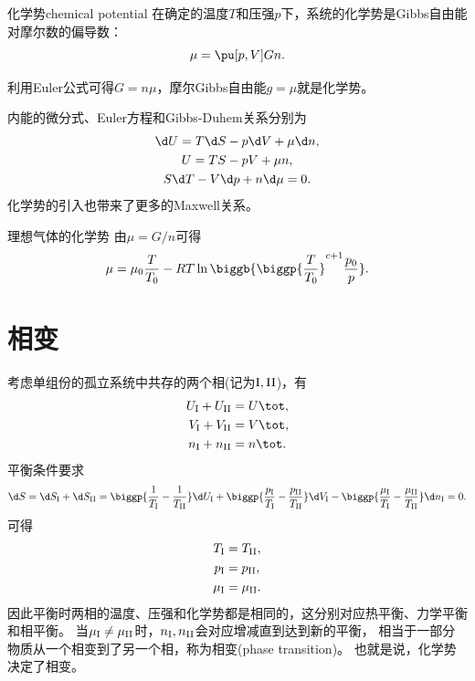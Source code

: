 \begin{definition}
	{化学势}{chemical potential}
	在确定的温度$T$和压强$p$下，系统的化学势是Gibbs自由能对摩尔数的偏导数：
	\begin{equation}
		\mu=\pu[p,V]Gn.
	\end{equation}
\end{definition}

\begin{corollary}
	利用Euler公式可得$G=n\mu$，摩尔Gibbs自由能$g=\mu$就是化学势。
\end{corollary}

\begin{corollary}
	内能的微分式、Euler方程和Gibbs-Duhem关系分别为
	\begin{subequations}
		\begin{gather}
			\d U=T\d S-p\d V+\mu\d n,\\
			U=TS-pV+\mu n,\\
			S\d T-V\d p+n\d\mu=0.
		\end{gather}
	\end{subequations}
	化学势的引入也带来了更多的Maxwell关系。
\end{corollary}

\begin{example}
	{理想气体的化学势}{}
	由$\mu=G/n$可得
	\begin{equation}
		\mu=\mu_0\frac T{T_0}-RT\ln\biggb{\biggp{\frac T{T_0}}^{c+1}\frac{p_0}p}.
	\end{equation}
\end{example}

\section{相变}
\label{sec:phase transition}

考虑单组份的孤立系统中共存的两个相(记为$\mathrm{I},\mathrm{II}$)，有
\begin{align*}
	U_\phI+U_\phII&=U\tot,\\
	V_\phI+V_\phII&=V\tot,\\
	n_\phI+n_\phII&=n\tot.
\end{align*}
平衡条件要求
\[
	\d S=\d S_\phI+\d S_\phII
	=\biggp{\frac1{T_\phI}-\frac1{T_\phII}}\d U_\phI
	+\biggp{\frac{p_\phI}{T_\phI}-\frac{p_\phII}{T_\phII}}\d V_\phI
	-\biggp{\frac{\mu_\phI}{T_\phI}-\frac{\mu_\phII}{T_\phII}}\d n_\phI
	=0.
\]
可得
\begin{subequations}
	\begin{align}
		T_{\mathrm{I}}&=T_{\mathrm{II}},\\
		p_{\mathrm{I}}&=p_{\mathrm{II}},\\
		\mu_{\mathrm{I}}&=\mu_{\mathrm{II}}.
	\end{align}
\end{subequations}
因此平衡时两相的温度、压强和化学势都是相同的，这分别对应热平衡、力学平衡和相平衡。
当$\mu_{\mathrm{I}}\neq\mu_{\mathrm{II}}$时，$n_{\mathrm{I}},n_{\mathrm{II}}$会对应增减直到达到新的平衡，
相当于一部分物质从一个相变到了另一个相，称为相变(phase transition)。
也就是说，化学势决定了相变。

